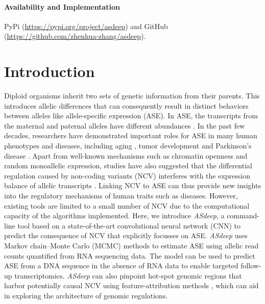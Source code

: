 \documentclass{book}
\begin{document}
\begin{refsection}
\paragraph*{Availability and Implementation} PyPi (\url{https://pypi.org/project/asdeep}) and GitHub (\url{https://github.com/zhenhua-zhang/asdeep}).

\newpage
\section*{Introduction}
Diploid organisms inherit two sets of genetic information from their parents.
This introduces allelic differences that can consequently result in distinct behaviors between alleles like allele-specific expression (ASE).
In ASE, the transcripts from the maternal and paternal alleles have different abundances \cite{Pastinen2010Genome}.
In the past few decades, researchers have demonstrated important roles for ASE in many human phenotypes and diseases, including aging \cite{Balliu2019Genetic}, tumor development \cite{Liu2018A,Przytycki2020Differential} and Parkinson’s disease \cite{Langmyhr2021Allele}.
Apart from well-known mechanisms such as chromatin openness and random monoallelic expression, studies have also suggested that the differential regulation caused by non-coding variants (NCV) interferes with the expression balance of allelic transcripts \cite{Bader2015Negative,Ge2009Global,Pickrell2010Understanding,Lefebvre2012Genotype}.
Linking NCV to ASE can thus provide new insights into the regulatory mechanisms of human traits such as diseases.
However, existing tools are limited to a small number of NCV due to the computational capacity of the algorithms implemented.
Here, we introduce \textit{ASdeep}, a command-line tool based on a state-of-the-art convolutional neural network (CNN) to predict the consequence of NCV that explicitly focusses on ASE.
\textit{ASdeep} uses Markov chain–Monte Carlo (MCMC) methods to estimate ASE using allelic read counts quantified from RNA sequencing data.
The model can be used to predict ASE from a DNA sequence in the absence of RNA data to enable targeted follow-up transcriptomics.
\textit{ASdeep} can also pinpoint hot-spot genomic regions that harbor potentially causal NCV using feature-attribution methods \cite{Explainable2020Xie}, which can aid in exploring the architecture of genomic regulations.


\end{refsection}
\end{document}
